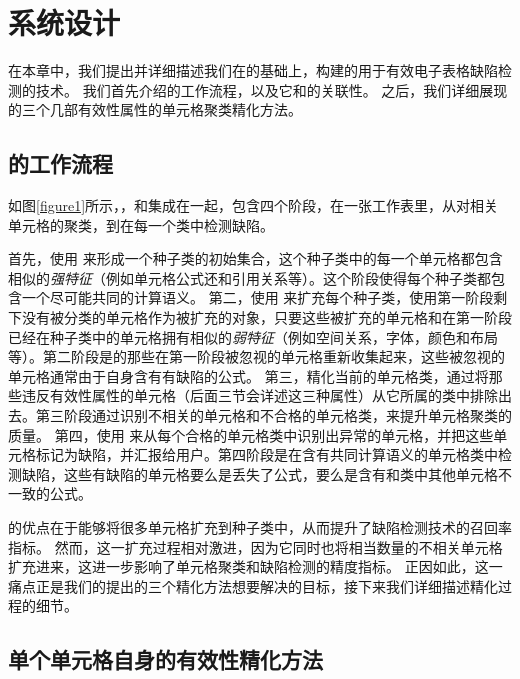 \chapter{系统设计}

在本章中，我们提出并详细描述我们在\cu 的基础上，构建的用于有效电子表格缺陷检测的技术\wa 。
我们首先介绍\wa 的工作流程，以及它和\cu 的关联性。
之后，我们详细展现\wa 的三个几部有效性属性的单元格聚类精化方法。

\section{\wa 的工作流程}



如图\ref{figure1}所示，\wa ，和\cu 集成在一起，包含四个阶段，在一张工作表里，从对相关单元格的聚类，到在每一个类中检测缺陷。

首先，\wa 使用 \cu 来形成一个种子类的初始集合，这个种子类中的每一个单元格都包含相似的\textit{强特征}（例如单元格公式还和引用关系等）。这个阶段使得每个种子类都包含一个尽可能共同的计算语义。
第二，\wa 使用 \cu 来扩充每个种子类，使用第一阶段剩下没有被分类的单元格作为被扩充的对象，只要这些被扩充的单元格和在第一阶段已经在种子类中的单元格拥有相似的\textit{弱特征}（例如空间关系，字体，颜色和布局等）。第二阶段是的那些在第一阶段被忽视的单元格重新收集起来，这些被忽视的单元格通常由于自身含有有缺陷的公式。
第三，\wa 精化当前的单元格类，通过将那些违反有效性属性的单元格（后面三节会详述这三种属性）从它所属的类中排除出去。第三阶段通过识别不相关的单元格和不合格的单元格类，来提升单元格聚类的质量。
第四，\wa 使用 \cu 来从每个合格的单元格类中识别出异常的单元格，并把这些单元格标记为缺陷，并汇报给用户。第四阶段是在含有共同计算语义的单元格类中检测缺陷，这些有缺陷的单元格要么是丢失了公式，要么是含有和类中其他单元格不一致的公式。

\cu 的优点在于能够将很多单元格扩充到种子类中，从而提升了缺陷检测技术的召回率指标\cite{cheung2016custodes}。
然而，这一扩充过程相对激进，因为它同时也将相当数量的不相关单元格扩充进来，这进一步影响了单元格聚类和缺陷检测的精度指标。
正因如此，这一痛点正是我们的\wa 提出的三个精化方法想要解决的目标，接下来我们详细描述精化过程的细节。

\section{单个单元格自身的有效性精化方法}



